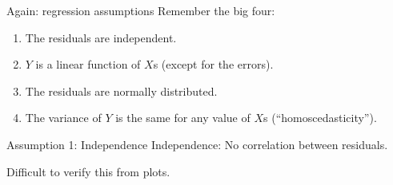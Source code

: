 \documentclass{beamer}\usepackage[]{graphicx}\usepackage[]{color}
\makeatletter
\newcommand{\hlopt}[1]{\textcolor[rgb]{1,0.894,0.769}{#1}}%
\newcommand{\hlstd}[1]{\textcolor[rgb]{1,0.894,0.769}{#1}}%
\newcommand{\hlkwd}[1]{\textcolor[rgb]{1,0.78,0.769}{#1}}%
\newenvironment{kframe}{%
 \def\at@end@of@kframe{}%
 \ifinner\ifhmode%
  \def\at@end@of@kframe{\end{minipage}}%
  \begin{minipage}{\columnwidth}%
 \fi\fi%
 \def\FrameCommand##1{\hskip\@totalleftmargin \hskip-\fboxsep
 \colorbox{shadecolor}{##1}\hskip-\fboxsep
     \hskip-\linewidth \hskip-\@totalleftmargin \hskip\columnwidth}%
 \MakeFramed {\advance\hsize-\width
   \@totalleftmargin\z@ \linewidth\hsize
   \@setminipage}}%
 {\par\unskip\endMakeFramed%
 \at@end@of@kframe}
\newenvironment{knitrout}{}{} %
\makeatother
\begin{document}
\begin{darkframes}
    
    
    
    \begin{frame}{Again: regression assumptions}
      Remember the big four:
      \begin{enumerate}
        \item \alert{The residuals are independent.}
        \item $Y$ is a linear function of $X$s (except for the errors).
        \item The residuals are normally distributed.
        \item The variance of $Y$ is the same for any value of $X$s (``homoscedasticity'').
    
      \end{enumerate}
    \end{frame}
    
    
    \begin{frame}[fragile]{Assumption 1: Independence}
      Independence: No correlation between residuals. \pause
    
      Difficult to verify this from plots.
      
    \end{frame}
    

    
    

\end{darkframes}
\end{document}
